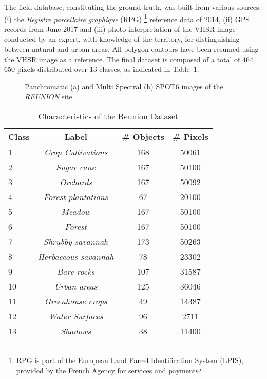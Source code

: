\documentclass[journal]{IEEEtran}
\begin{document}
The field database, constituting the ground truth, was built from various sources: (i) the \textit{Registre parcellaire graphique} (RPG) \footnote{RPG is part of the European Land Parcel Identification System (LPIS), provided by the French Agency for services and payment} reference data of 2014, (ii) GPS records from June 2017 and (iii) photo interpretation of the VHSR image conducted by an expert, with knowledge of the territory, for distinguishing between natural and urban areas. All polygon contours have been resumed using the VHSR image as a reference. The final dataset is composed of a total of 464\,650 pixels  distributed over 13 classes, as indicated in Table~\ref{tab:data_reu}.

\begin{figure}[!ht]
\centering
{}
\caption{ Panchromatic (a) and Multi Spectral (b) SPOT6 images of the \textit{REUNION} site. \label{fig:Reunion_PAN_XS} }
\end{figure}\begin{table}[!ht]
\centering
\begin{tabular}{|l||c|c|c|}
	\hline
\textbf{Class} & Label & \# \textbf{Objects} & \# \textbf{Pixels} \\
\hline \hline
1 & {\em Crop Cultivations} & 168 & 50061 \\ \hline
2 & {\em Sugar cane} & 167 & 50100  \\ \hline
3 & {\em Orchards} & 167 & 50092 \\ \hline
4 & {\em Forest plantations} & 67 & 20100 \\ \hline
5 & {\em Meadow} & 167 & 50100 \\ \hline
6 & {\em Forest} & 167 & 50100 \\ \hline
7 & {\em Shrubby savannah} & 173 & 50263 \\ \hline
8 & {\em Herbaceous savannah} & 78 & 23302 \\ \hline
9 & {\em Bare rocks} & 107 & 31587 \\ \hline
10 & {\em Urban areas} & 125 & 36046 \\ \hline
11 & {\em Greenhouse crops}& 49 & 14387 \\ \hline
12 & {\em Water Surfaces} & 96 &  2711\\ \hline
13 & {\em Shadows} & 38 & 11400 \\ \hline
\end{tabular}
\caption{Characteristics of the Reunion Dataset\label{tab:data_reu}}
\end{table}%
\end{document}
